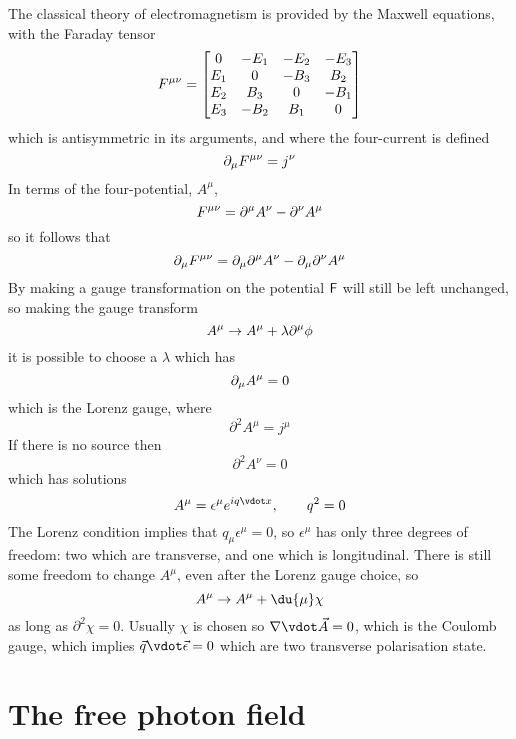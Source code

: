 The classical theory of electromagnetism is provided by the Maxwell
equations, with the Faraday tensor
\begin{equation}
  \label{eq:114}
  \tensor{F}{^{\mu \nu}} =
  \begin{bmatrix}
    0   & -E_1 &-E_2 & -E_3 \\ E_1 & 0 & -B_3 & B_2 \\
    E_2 & B_3 & 0 & -B_1 \\ E_3 & -B_2 & B_1 & 0
  \end{bmatrix}
\end{equation}
which is antisymmetric in its arguments, and where the four-current is
defined 
\begin{equation}
  \label{eq:115}
\partial_{\mu} F^{\mu \nu} = j^{\nu}
\end{equation}
In terms of the four-potential, $A^\mu$,
\begin{equation}
  \label{eq:116}
F^{\mu \nu} = \partial^{\mu} A^{\nu} - \partial^{\nu} A^{\mu}
\end{equation}
so it follows that
\[
\partial_{\mu} F^{\mu \nu} = \partial_{\mu} \partial^{\mu} A^{\nu} - \partial_{\mu} \partial^{\nu} A^{\mu}
\]
By making a gauge transformation on the potential $\mathsf{F}$ will still
be left unchanged, so making the gauge transform
\[ A^{\mu} \to A^{\mu} + \lambda \partial^{\mu} \phi \]
it is possible to choose a $\lambda$ which has
\[ \partial_{\mu} A^{\mu} = 0 \]
which is the Lorenz gauge, where \[ \partial^2 A^{\mu} = j^{\mu} \]
If there is no source then \[ \partial^2 A^{\nu} = 0 \] which has solutions
\[ A^{\mu} = \epsilon^{\mu} e^{i q \vdot x}, \qquad q^2 = 0 \]
The Lorenz condition implies that $q_{\mu} \epsilon^{\mu} = 0$, so
$\epsilon^{\mu}$ has only three degrees of freedom: two which are
transverse, and one which is longitudinal. There is still some freedom
to change $A^{\mu}$, even after the Lorenz gauge choice, so
\[ A^{\mu} \to A^{\mu} + \du{\mu}\chi\]
as long as $\partial^2 \chi = 0$. Usually $\chi$ is chosen so
$\nabla \vdot \vec{A} = 0$, which is the Coulomb gauge, which implies
$\vec{q} \vdot \vec{\epsilon}=0$ which are two transverse polarisation
state.

\section{The free photon field}
\label{sec:free-photon-field}

